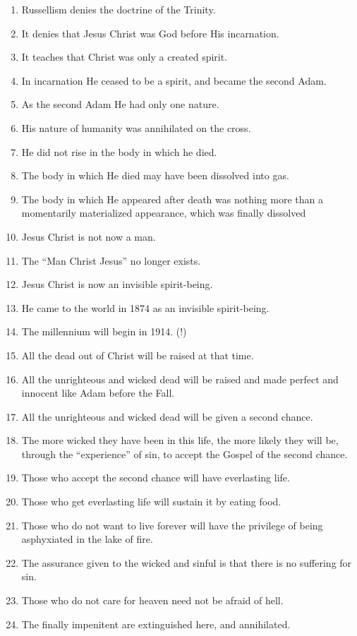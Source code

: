 \documentclass[
]{book}
\begin{document}
\begin{enumerate}
\def\labelenumi{\arabic{enumi}.}
\item
  Russellism denies the doctrine of the Trinity.
\item
  It denies that Jesus Christ was God before His incarnation.
\item
  It teaches that Christ was only a created spirit.
\item
  In incarnation He ceased to be a spirit, and became the second Adam.
\item
  As the second Adam He had only one nature.
\item
  His nature of humanity was annihilated on the cross.
\item
  He did not rise in the body in which he died.
\item
  The body in which He died may have been dissolved into gas.
\item
  The body in which He appeared after death was nothing more than a momentarily materialized appearance, which was finally dissolved
\item
  Jesus Christ is not now a man.
\item
  The ``Man Christ Jesus'' no longer exists.
\item
  Jesus Christ is now an invisible spirit-being.
\item
  He came to the world in 1874 as an invisible spirit-being.
\item
  The millennium will begin in 1914. (!)
\item
  All the dead out of Christ will be raised at that time.
\item
  All the unrighteous and wicked dead will be raised and made perfect and innocent like Adam before the Fall.
\item
  All the unrighteous and wicked dead will be given a second chance.
\item
  The more wicked they have been in this life, the more likely they will be, through the ``experience'' of sin, to accept the Gospel of the second chance.
\item
  Those who accept the second chance will have everlasting life.
\item
  Those who get everlasting life will sustain it by eating food.
\item
  Those who do not want to live forever will have the privilege of being asphyxiated in the lake of fire.
\item
  The assurance given to the wicked and sinful is that there is no suffering for sin.
\item
  Those who do not care for heaven need not be afraid of hell.
\item
  The finally impenitent are extinguished here, and annihilated.
\end{enumerate}
\end{document}

